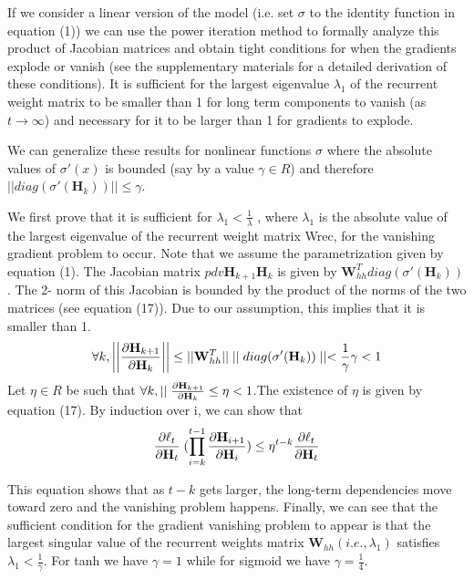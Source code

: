 \documentclass{article}
\begin{document}
If we consider a linear version of the model (i.e. set $\sigma$ to
the identity function in equation (1)) we can use the
power iteration method to formally analyze this product 
of Jacobian matrices and obtain tight conditions
for when the gradients explode or vanish (see the supplementary materials for a detailed derivation of these
conditions). It is sufficient for the largest eigenvalue
$\lambda_1$ of the recurrent weight matrix to be smaller than
1 for long term components to vanish (as $t \rightarrow \infty$) and
necessary for it to be larger than 1 for gradients to
explode.

We can generalize these results for nonlinear functions
$\sigma$ where the absolute values of $\sigma'(x)$ is bounded (say
by a value $\gamma \in R$) and therefore $||diag(\sigma'(\mathbf{H}_k))|| \le \gamma$.

We first prove that it is sufficient for $\lambda_1 < \frac{1}{\lambda}$ , where
$\lambda_1$ is the absolute value of the largest eigenvalue of
the recurrent weight matrix Wrec, for the vanishing
gradient problem to occur. Note that we assume the
parametrization given by equation (1). The Jacobian
matrix $pdv{\mathbf{H}_{k+1}}{\mathbf{H}_k}$ is given by $\mathbf{W}_{hh}^T diag(\sigma'(\mathbf{H}_k))$. The 2-
norm of this Jacobian is bounded by the product of the norms of the two matrices (see equation (17)). Due
to our assumption, this implies that it is smaller than 1.
\begin{equation}
  \forall k, \bigg |\bigg | \pdv{\mathbf{H}_{k+1}}{\mathbf{H}_k} \bigg |\bigg | \le ||\mathbf{W}_{hh}^T||
  \mid\mid diag(\sigma'(\mathbf{H}_k))\mid\mid < \frac{1}{\gamma}\gamma < 1
\end{equation} 
Let $\eta \in R$ be such that $\forall k, \mid\mid \pdv{\mathbf{H}_{k+1}}{\mathbf{H}_k} \le \eta < 1$.The
existence of $\eta$ is given by equation (17). By induction
over i, we can show that
\begin{equation}
  \pdv{\ell_t}{\mathbf{H}_t} \; (\prod_{i=k}^{t-1} \pdv{\mathbf{H}_{i+1}}{\mathbf{H}_i}) \le \eta^{t-k} \pdv{\ell_t}{\mathbf{H}_t}
\end{equation}

This equation shows that as $t-k$ gets larger, the long-term
dependencies move toward zero and the vanishing problem
happens. Finally, we can see that the sufficient condition for
the gradient vanishing problem to appear is that the largest
singular value of the recurrent weights matrix $\mathbf{W}_{hh} (i.e., \lambda_1)$
satisfies $\lambda_1 < \frac{1}{\gamma}$. For tanh we have $\gamma = 1$ while for sigmoid we have $\gamma = \frac{1}{4}$.
\end{document}
